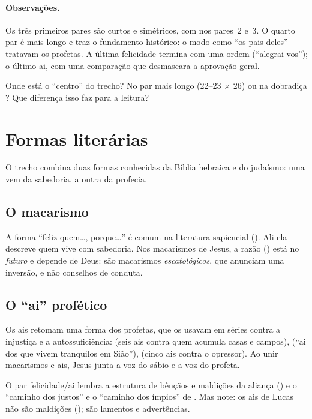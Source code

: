 \paragraph{Observações.}
Os três primeiros pares são curtos e simétricos, com  nos
pares~2 e~3. O quarto par é mais longo e traz o fundamento histórico: o modo
como \enquote{os pais deles} tratavam os profetas. A última felicidade termina
com uma ordem (\enquote{alegrai-vos}); o último ai, com uma comparação que
desmascara a aprovação geral.

\begin{pergunta}
Onde está o \enquote{centro} do trecho? No par mais longo (22–23 × 26) ou
na dobradiça ? Que diferença isso faz para a leitura?
\end{pergunta}

\section{Formas literárias}

O trecho combina duas formas conhecidas da Bíblia hebraica e do judaísmo:
uma vem da sabedoria, a outra da profecia.

\subsection{O macarismo}
A forma \enquote{feliz quem\ldots, porque\ldots} é comum na literatura
sapiencial (). Ali ela descreve quem vive com
sabedoria. Nos macarismos de Jesus, a razão () está no \emph{futuro}
e depende de Deus: são macarismos \emph{escatológicos}, que anunciam uma
inversão, e não conselhos de conduta.

\subsection{O \enquote{ai} profético}
Os ais retomam uma forma dos profetas, que os usavam em séries contra a
injustiça e a autossuficiência:  (seis ais contra quem acumula
casas e campos),  (\enquote{ai dos que vivem tranquilos em Sião}),
 (cinco ais contra o opressor). Ao unir macarismos e ais, Jesus
junta a voz do sábio e a voz do profeta.

\begin{nota}
O par felicidade/ai lembra a estrutura de bênçãos e maldições da aliança
() e o \enquote{caminho dos justos} e o \enquote{caminho dos
ímpios} de . Mas note: os ais de Lucas não são maldições
(); são lamentos e advertências.
\end{nota}

